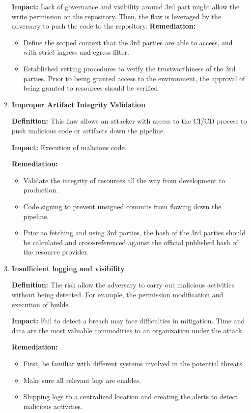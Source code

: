 \begin{enumerate}[label=(\arabic*)]
    \textbf{Impact: }
        Lack of governance and visibility around 3rd part might allow the write permission on the repository.
        Then, the flaw is leveraged by the adversary to push the code to the repository.
    \textbf{Remediation:}
        \begin{itemize}
            \item Define the scoped context that the 3rd parties are able to access, and with strict ingress
            and egress filter.
            \item Established vetting procedures to verify the trustworthiness of the 3rd parties. Prior to being 
            granted access to the environment, the approval of being granted to resources should be verified.
        \end{itemize}
    \item \textbf{Improper Artifact Integrity Validation}

    \textbf{Definition: }
        This flaw allows an attacker with access to the CI/CD process to push malicious code or artifacts down 
        the pipeline.

    \textbf{Impact: }
        Execution of malicious code.

    \textbf{Remediation:}
        \begin{itemize}
            \item Validate the integrity of resources all the way from development to production.
            \item Code signing to prevent unsigned commits from flowing down the pipeline.
            \item Prior to fetching and using 3rd parties, the hash of the 3rd parties should be calculated and 
            cross-referenced against the official published hash of the resource provider.
        \end{itemize}
        
    \item \textbf{Insufficient logging and visibility}

    \textbf{Definition: }
        The risk allow the adversary to carry out malicious activities without being detected.
        For example, the permission modification and execution of builds.

    \textbf{Impact: }
        Fail to detect a breach may face difficulties in mitigation. Time and data are the most 
        valuable commodities to an organization under the attack.

    \textbf{Remediation:}
        \begin{itemize}
            \item First, be familiar with different systems involved in the potential threats.
            \item Make sure all relevant logs are enables.
            \item Shipping logs to a centralized location and creating the alerts to detect malicious activities.
        \end{itemize}
\end{enumerate}

